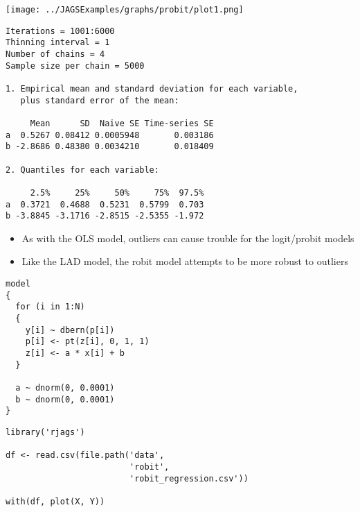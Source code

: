 \documentclass{beamer}
\begin{document}
\begin{frame}[fragile]
  \begin{center}
    \texttt{[image: ../JAGSExamples/graphs/probit/plot1.png]}
  \end{center}
\end{frame}

\begin{frame}[fragile]
  \begin{verbatim}
Iterations = 1001:6000
Thinning interval = 1 
Number of chains = 4 
Sample size per chain = 5000 

1. Empirical mean and standard deviation for each variable,
   plus standard error of the mean:

     Mean      SD  Naive SE Time-series SE
a  0.5267 0.08412 0.0005948       0.003186
b -2.8686 0.48380 0.0034210       0.018409

2. Quantiles for each variable:

     2.5%     25%     50%     75%  97.5%
a  0.3721  0.4688  0.5231  0.5799  0.703
b -3.8845 -3.1716 -2.8515 -2.5355 -1.972
  \end{verbatim}
\end{frame}

\begin{frame}
  \begin{itemize}
    \item{As with the OLS model, outliers can cause trouble for the logit/probit models}
    \item{Like the LAD model, the robit model attempts to be more robust to outliers}
  \end{itemize}
\end{frame}

\begin{frame}[fragile]
  \begin{verbatim}
model
{
  for (i in 1:N)
  {
    y[i] ~ dbern(p[i])
    p[i] <- pt(z[i], 0, 1, 1)
    z[i] <- a * x[i] + b
  }
  
  a ~ dnorm(0, 0.0001)
  b ~ dnorm(0, 0.0001)
}
  \end{verbatim}
\end{frame}

\begin{frame}[fragile]
  \begin{verbatim}
library('rjags')

df <- read.csv(file.path('data',
                         'robit',
                         'robit_regression.csv'))

with(df, plot(X, Y))
  \end{verbatim}
\end{frame}
\end{document}
